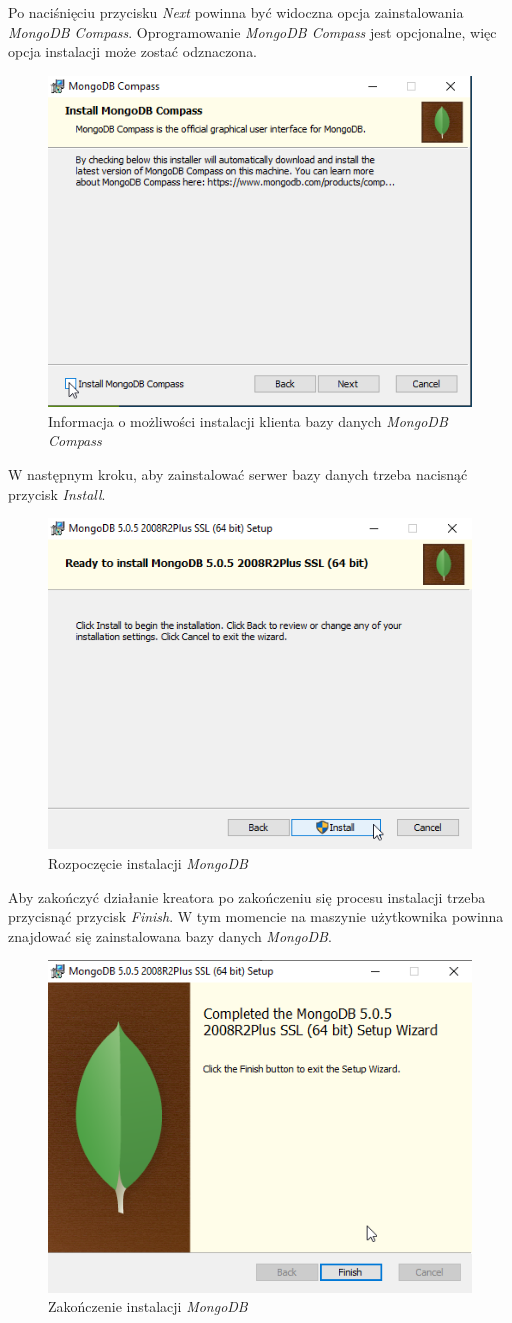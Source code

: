 \documentclass[a4paper,twoside,12pt]{book}
\begin{document}
Po naciśnięciu przycisku \textit{Next} powinna być widoczna opcja zainstalowania \textit{MongoDB Compass}. Oprogramowanie \textit{MongoDB Compass} jest opcjonalne, więc opcja instalacji może zostać odznaczona.
\FloatBarrier
\begin{figure}[H]
	\centering
	\includegraphics[width=0.5\linewidth]{../zrzuty_ekranu/instalcja_mongodb/mogndodb5}
	\caption{Informacja o możliwości instalacji klienta bazy danych \textit{MongoDB Compass}}
	\label{fig:mogndodb5}
\end{figure}
\afterpage{\clearpage}
\FloatBarrier

W następnym kroku, aby zainstalować serwer bazy danych trzeba nacisnąć przycisk \textit{Install}.
\FloatBarrier
\begin{figure}[H]
	\centering
	\includegraphics[width=0.5\linewidth]{../zrzuty_ekranu/instalcja_mongodb/mongodb6}
	\caption{Rozpoczęcie instalacji \textit{MongoDB}}
	\label{fig:mongodb6}
\end{figure}
\afterpage{\clearpage}
\FloatBarrier

Aby zakończyć działanie kreatora po zakończeniu się procesu instalacji trzeba przycisnąć przycisk \textit{Finish}. W tym momencie na maszynie użytkownika powinna znajdować się zainstalowana bazy danych \textit{MongoDB}.
\FloatBarrier
\begin{figure}[H]
	\centering
	\includegraphics[width=0.5\linewidth]{../zrzuty_ekranu/instalcja_mongodb/mongodb_finish}
	\caption{Zakończenie instalacji \textit{MongoDB}}
	\label{fig:mongodbfinish}
\end{figure}
\afterpage{\clearpage}
\FloatBarrier
\end{document}
